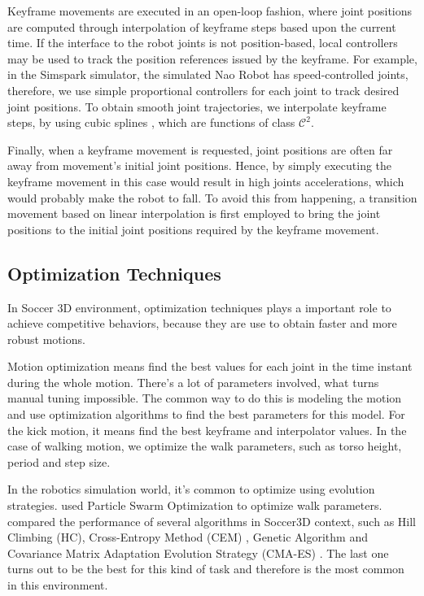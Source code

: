 Keyframe movements are executed in an open-loop fashion, where joint positions are computed through interpolation of keyframe steps based upon the current time. If the interface to the robot joints is not position-based, local controllers may be used to track the position references issued by the keyframe. For example, in the Simspark simulator, the simulated Nao Robot has speed-controlled joints, therefore, we use simple proportional controllers for each joint to track desired joint positions. To obtain smooth joint trajectories, we interpolate keyframe steps, by using cubic splines \cite{bartels1987}, which are functions of class \( \mathcal{C}^2 \). 

Finally, when a keyframe movement is requested, joint positions are often far away from movement's initial joint positions. Hence, by simply executing the keyframe movement in this case would result in high joints accelerations, which would probably make the robot to fall. To avoid this from happening, a transition movement based on linear interpolation is first employed to bring the joint positions to the initial joint positions required by the keyframe movement.

\subsection{Optimization Techniques}

In Soccer 3D environment, optimization techniques plays a important role to achieve competitive behaviors, because they are use to obtain faster and more robust motions.

Motion optimization means find the best values for each joint in the time instant during the whole motion. There's a lot of parameters involved, what turns manual tuning impossible. The common way to do this is modeling the motion and use optimization algorithms to find the best parameters for this model. For the kick motion, it means find the best keyframe and interpolator values. In the case of walking motion, we optimize the walk parameters, such as torso height, period and step size.

In the robotics simulation world, it's common to optimize using evolution strategies. \cite{tgmaximo} used Particle Swarm Optimization to optimize walk parameters. \cite{AAMAS11-urieli} compared the performance of several algorithms in Soccer3D context, such as Hill Climbing (HC), Cross-Entropy Method (CEM) \cite{Rubinstein:2004:CEM:1014902}, Genetic Algorithm and Covariance Matrix Adaptation Evolution Strategy (CMA-ES) \cite{cmaes}. The last one turns out to be the best for this kind of task and therefore is the most common in this environment. 

